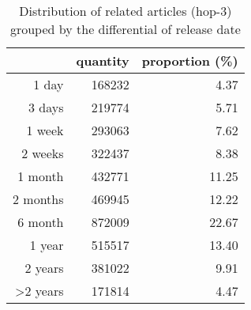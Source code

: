 \begin{table}[!htb]
    \centering
\begin{tabular}{rrr}
\hline
     &   quantity &   proportion (\%) \\
\hline
   1 day &  168232  &             4.37 \\
   3 days &  219774  &             5.71 \\
   1 week &  293063  &             7.62 \\
   2 weeks &  322437  &             8.38 \\
  1 month &  432771  &            11.25 \\
  2 months &  469945  &            12.22 \\
  6 month &  872009  &            22.67 \\
  1 year &  515517  &            13.40 \\
  2 years &  381022  &             9.91 \\
  \textgreater 2 years &  171814  &             4.47 \\
\hline
\end{tabular}
    \caption{Distribution of related articles (hop-3) grouped by the differential of release date}
    \label{tab:release_dist_related}
\end{table}

